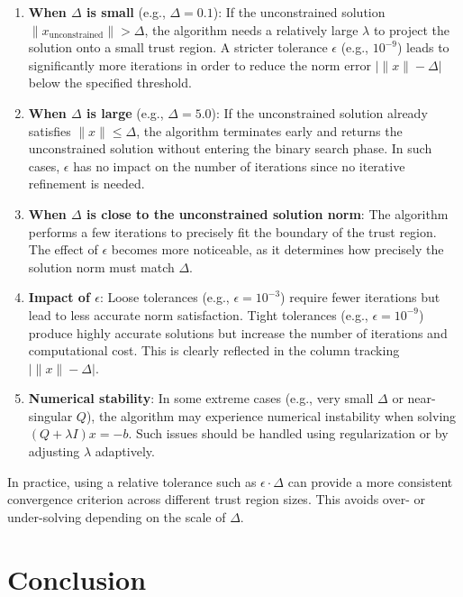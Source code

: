 \documentclass[12pt]{article}
\begin{document}
\begin{enumerate}
    \item \textbf{When $\Delta$ is small} (e.g., $\Delta = 0.1$): If the unconstrained solution $\|x_{\text{unconstrained}}\| > \Delta$, the algorithm needs a relatively large $\lambda$ to project the solution onto a small trust region. A stricter tolerance $\epsilon$ (e.g., $10^{-9}$) leads to significantly more iterations in order to reduce the norm error $|\|x\| - \Delta|$ below the specified threshold.

    \item \textbf{When $\Delta$ is large} (e.g., $\Delta = 5.0$): If the unconstrained solution already satisfies $\|x\| \le \Delta$, the algorithm terminates early and returns the unconstrained solution without entering the binary search phase. In such cases, $\epsilon$ has no impact on the number of iterations since no iterative refinement is needed.

    \item \textbf{When $\Delta$ is close to the unconstrained solution norm}: The algorithm performs a few iterations to precisely fit the boundary of the trust region. The effect of $\epsilon$ becomes more noticeable, as it determines how precisely the solution norm must match $\Delta$.

    \item \textbf{Impact of $\epsilon$}: Loose tolerances (e.g., $\epsilon = 10^{-3}$) require fewer iterations but lead to less accurate norm satisfaction. Tight tolerances (e.g., $\epsilon = 10^{-9}$) produce highly accurate solutions but increase the number of iterations and computational cost. This is clearly reflected in the column tracking $|\|x\| - \Delta|$.

    \item \textbf{Numerical stability}: In some extreme cases (e.g., very small $\Delta$ or near-singular $Q$), the algorithm may experience numerical instability when solving $(Q + \lambda I)x = -b$. Such issues should be handled using regularization or by adjusting $\lambda$ adaptively. 
\end{enumerate}
In practice, using a relative tolerance such as $\epsilon \cdot \Delta$ can provide a more consistent convergence criterion across different trust region sizes. This avoids over- or under-solving depending on the scale of $\Delta$.


\section{Conclusion}

\end{document}
